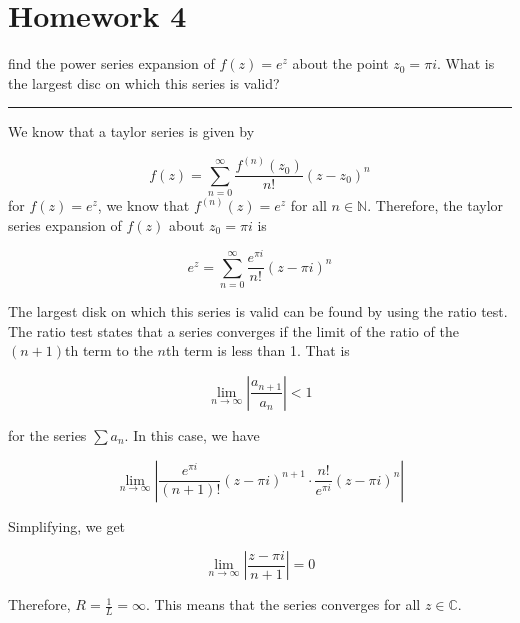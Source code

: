 \chapter{Homework 4}

\begin{example}

    find the power series expansion of $f(z) = e^z$ about the point $z_0 = \pi i$. What is the largest disc on which this series is valid?

    \hrule
    \vspace{0.5cm}

    We know that a taylor series is given by

    \begin{equation}
        f(z) = \sum_{n=0}^{\infty} \frac{f^{(n)}(z_0)}{n!} (z - z_0)^n
    \end{equation}
    for $f(z) = e^z$, we know that $f^{(n)}(z) = e^z$ for all $n \in \mathbb{N}$. Therefore, the taylor series expansion of $f(z)$ about $z_0 = \pi i$ is

    \begin{equation}
        e^z = \sum_{n=0}^{\infty} \frac{e^{\pi i}}{n!} (z - \pi i)^n
    \end{equation}

    The largest disk on which this series is valid can be found by using the ratio test. The ratio test states that a series converges if the limit of the ratio of the $(n+1)$th term to the $n$th term is less than 1. That is

    \begin{equation}
        \lim_{n \to \infty} \left| \frac{a_{n+1}}{a_n} \right| < 1
    \end{equation}

    for the series $\sum a_n$. In this case, we have

    \begin{equation}
        \lim_{n \to \infty} \left| \frac{e^{\pi i}}{(n+1)!} (z - \pi i)^{n+1} \cdot \frac{n!}{e^{\pi i}} (z - \pi i)^n \right|
    \end{equation}

    Simplifying, we get

    \begin{equation}
        \lim_{n \to \infty} \left| \frac{z - \pi i}{n+1} \right| = 0
    \end{equation}

    Therefore, $R = \frac{1}{L} = \infty$. This means that the series converges for all $z \in \mathbb{C}$.

\end{example}

